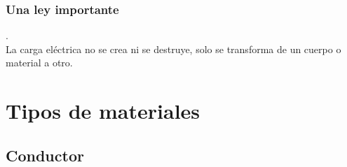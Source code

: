 \documentclass[14pt]{beamer}
\begin{document}
\begin{frame}
    \frametitle{Una ley importante}
    .
    \\
    \bigskip
    La carga eléctrica no se crea ni se destruye, solo se transforma de un cuerpo o material a otro.
    \end{frame}
    
\section{Tipos de materiales}
\subsection{Conductor}
\end{document}
